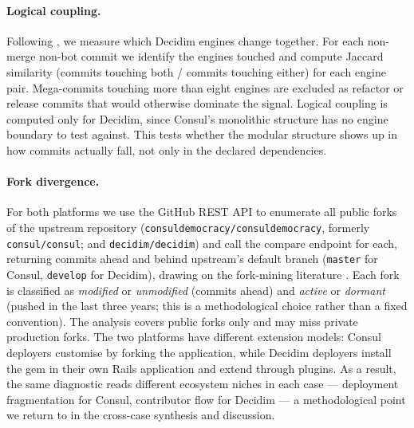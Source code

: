 \documentclass[11pt,a4paper]{article}
\begin{document}
\paragraph{Logical coupling.}
Following \citet{gall1998detection}, we measure which Decidim engines change together. For each non-merge non-bot commit we identify the engines touched and compute Jaccard similarity (commits touching both / commits touching either) for each engine pair. Mega-commits touching more than eight engines are excluded as refactor or release commits that would otherwise dominate the signal. Logical coupling is computed only for Decidim, since Consul's monolithic structure has no engine boundary to test against. This tests whether the modular structure shows up in how commits actually fall, not only in the declared dependencies.

\paragraph{Fork divergence.}
For both platforms we use the GitHub REST API to enumerate all public forks of the upstream repository (\texttt{consuldemocracy/\allowbreak consuldemocracy}, formerly \texttt{consul/consul}; and \texttt{decidim/decidim}) and call the compare endpoint for each, returning commits ahead and behind upstream's default branch (\texttt{master} for Consul, \texttt{develop} for Decidim), drawing on the fork-mining literature \citep{zhou2020forks, wang2023forkentropy, businge2022reuse}. Each fork is classified as \emph{modified} or \emph{unmodified} (commits ahead) and \emph{active} or \emph{dormant} (pushed in the last three years; this is a methodological choice rather than a fixed convention). The analysis covers public forks only and may miss private production forks. The two platforms have different extension models: Consul deployers customise by forking the application, while Decidim deployers install the gem in their own Rails application and extend through plugins. As a result, the same diagnostic reads different ecosystem niches in each case --- deployment fragmentation for Consul, contributor flow for Decidim --- a methodological point we return to in the cross-case synthesis and discussion.
\end{document}
